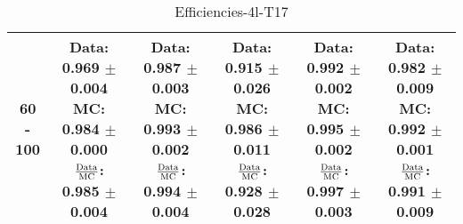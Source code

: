 \documentclass[final,letterpaper,twoside,12pt]{article}
\begin{document}
\begin{table}[htbp]
\begin{adjustwidth}{-4em}{-4em}
\begin{tabular}{|c|c|c|c|c|c|}
60 - 100 & \parbox[c]{1.1 in}{ \scriptsize  Data: 0.969 $\pm$ 0.004 \newline MC: 0.984 $\pm$ 0.000 \newline $\frac{\rm{Data}}{\rm{MC}}$: 0.985 $\pm$ 0.004} & \parbox[c]{1.1 in}{ \scriptsize  Data: 0.987 $\pm$ 0.003 \newline MC: 0.993 $\pm$ 0.002 \newline $\frac{\rm{Data}}{\rm{MC}}$: 0.994 $\pm$ 0.004} & \parbox[c]{1.1 in}{ \scriptsize  Data: 0.915 $\pm$ 0.026 \newline MC: 0.986 $\pm$ 0.011 \newline $\frac{\rm{Data}}{\rm{MC}}$: 0.928 $\pm$ 0.028} & \parbox[c]{1.1 in}{ \scriptsize  Data: 0.992 $\pm$ 0.002 \newline MC: 0.995 $\pm$ 0.002 \newline $\frac{\rm{Data}}{\rm{MC}}$: 0.997 $\pm$ 0.003} & \parbox[c]{1.1 in}{ \scriptsize  Data: 0.982 $\pm$ 0.009 \newline MC: 0.992 $\pm$ 0.001 \newline $\frac{\rm{Data}}{\rm{MC}}$: 0.991 $\pm$ 0.009}\\ \hline 
\end{tabular}
\caption {Efficiencies-4l-T17}
\label{tab:cqdata0}
\end{adjustwidth}\end{table}
\end{document}
